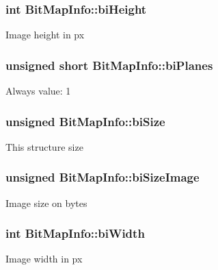 \subsubsection[{\texorpdfstring{bi\+Height}{biHeight}}]{\setlength{\rightskip}{0pt plus 5cm}int Bit\+Map\+Info\+::bi\+Height}\hypertarget{structBitMapInfo_a5130bfb9c8a6b3ad1ba710965ef3e61e}{}\label{structBitMapInfo_a5130bfb9c8a6b3ad1ba710965ef3e61e}
Image height in px 
\subsubsection[{\texorpdfstring{bi\+Planes}{biPlanes}}]{\setlength{\rightskip}{0pt plus 5cm}unsigned short Bit\+Map\+Info\+::bi\+Planes}\hypertarget{structBitMapInfo_a23dc89abcd16d62312b33e94d2c819b8}{}\label{structBitMapInfo_a23dc89abcd16d62312b33e94d2c819b8}
Always value\+: 1 
\subsubsection[{\texorpdfstring{bi\+Size}{biSize}}]{\setlength{\rightskip}{0pt plus 5cm}unsigned Bit\+Map\+Info\+::bi\+Size}\hypertarget{structBitMapInfo_a58417194f170d7733156cbcca49099e6}{}\label{structBitMapInfo_a58417194f170d7733156cbcca49099e6}
This structure size 
\subsubsection[{\texorpdfstring{bi\+Size\+Image}{biSizeImage}}]{\setlength{\rightskip}{0pt plus 5cm}unsigned Bit\+Map\+Info\+::bi\+Size\+Image}\hypertarget{structBitMapInfo_a6d98abd57de85a278eb3da36c13cbff4}{}\label{structBitMapInfo_a6d98abd57de85a278eb3da36c13cbff4}
Image size on bytes 
\subsubsection[{\texorpdfstring{bi\+Width}{biWidth}}]{\setlength{\rightskip}{0pt plus 5cm}int Bit\+Map\+Info\+::bi\+Width}\hypertarget{structBitMapInfo_aa43e4572f40397137e4149503764d151}{}\label{structBitMapInfo_aa43e4572f40397137e4149503764d151}
Image width in px 
